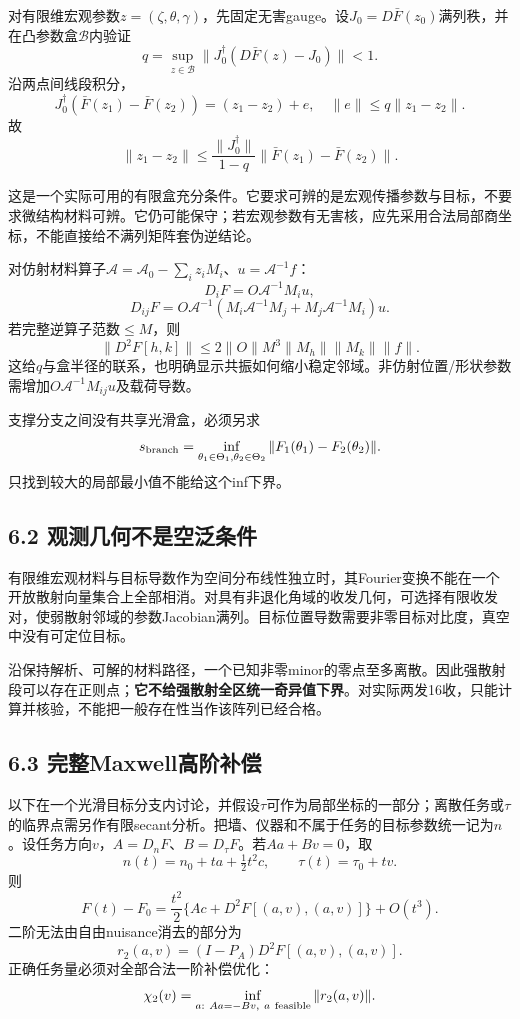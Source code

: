 \documentclass[
  10pt,
  a4paper,
]{article}
\begin{document}
对有限维宏观参数\(z=(\zeta,\theta,\gamma)\)，先固定无害gauge。设\(J_0=D\bar F(z_0)\)满列秩，并在凸参数盒\(\mathcal B\)内验证
\[
q=\sup_{z\in\mathcal B}
\|J_0^\dagger(D\bar F(z)-J_0)\|<1.
\] 沿两点间线段积分， \[
J_0^\dagger(\bar F(z_1)-\bar F(z_2))
=(z_1-z_2)+e,\quad \|e\|\le q\|z_1-z_2\|.
\] 故 \[
\boxed{
\|z_1-z_2\|
\le\frac{\|J_0^\dagger\|}{1-q}
\|\bar F(z_1)-\bar F(z_2)\|.
}
\]

这是一个实际可用的有限盒充分条件。它要求可辨的是宏观传播参数与目标，不要求微结构材料可辨。它仍可能保守；若宏观参数有无害核，应先采用合法局部商坐标，不能直接给不满列矩阵套伪逆结论。

对仿射材料算子\(\mathcal A=\mathcal A_0-\sum_i z_iM_i\)、\(u=\mathcal A^{-1}f\)：
\[
D_iF=O\mathcal A^{-1}M_i u,
\] \[
D_{ij}F
=O\mathcal A^{-1}
(M_i\mathcal A^{-1}M_j+M_j\mathcal A^{-1}M_i)u.
\] 若完整逆算子范数\(\le M\)，则 \[
\|D^2F[h,k]\|
\le2\|O\|M^3\|M_h\|\|M_k\|\|f\|.
\]
这给\(q\)与盒半径的联系，也明确显示共振如何缩小稳定邻域。非仿射位置/形状参数需增加\(O\mathcal A^{-1}M_{ij}u\)及载荷导数。

支撑分支之间没有共享光滑盒，必须另求 \[
s_{\rm branch}=\inf_{\theta_1\in\Theta_1,\theta_2\in\Theta_2}
\|F_1(\theta_1)-F_2(\theta_2)\|.
\] 只找到较大的局部最小值不能给这个inf下界。

\hypertarget{ux89c2ux6d4bux51e0ux4f55ux4e0dux662fux7a7aux6cdbux6761ux4ef6}{%
\subsection{6.2
观测几何不是空泛条件}\label{ux89c2ux6d4bux51e0ux4f55ux4e0dux662fux7a7aux6cdbux6761ux4ef6}}

有限维宏观材料与目标导数作为空间分布线性独立时，其Fourier变换不能在一个开放散射向量集合上全部相消。对具有非退化角域的收发几何，可选择有限收发对，使弱散射邻域的参数Jacobian满列。目标位置导数需要非零目标对比度，真空中没有可定位目标。

沿保持解析、可解的材料路径，一个已知非零minor的零点至多离散。因此强散射段可以存在正则点；\textbf{它不给强散射全区统一奇异值下界}。对实际两发16收，只能计算并核验，不能把一般存在性当作该阵列已经合格。

\hypertarget{ux5b8cux6574maxwellux9ad8ux9636ux8865ux507f}{%
\subsection{6.3
完整Maxwell高阶补偿}\label{ux5b8cux6574maxwellux9ad8ux9636ux8865ux507f}}

以下在一个光滑目标分支内讨论，并假设\(\tau\)可作为局部坐标的一部分；离散任务或\(\tau\)的临界点需另作有限secant分析。把墙、仪器和不属于任务的目标参数统一记为\(n\)。设任务方向\(v\)，\(A=D_nF\)、\(B=D_\tau F\)。若\(Aa+Bv=0\)，取
\[
n(t)=n_0+ta+\tfrac12t^2c,\qquad \tau(t)=\tau_0+tv.
\] 则 \[
F(t)-F_0
=\frac{t^2}{2}\{Ac+D^2F[(a,v),(a,v)]\}+O(t^3).
\] 二阶无法由自由nuisance消去的部分为 \[
r_2(a,v)=(I-P_A)D^2F[(a,v),(a,v)].
\] 正确任务量必须对全部合法一阶补偿优化： \[
\chi_2(v)=\inf_{a:\ Aa=-Bv,\ a\ {\rm feasible}}\|r_2(a,v)\|.
\]
\end{document}
